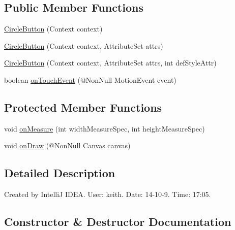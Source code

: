 \subsection*{Public Member Functions}
\begin{DoxyCompactItemize}
\item 
\hyperlink{classcom_1_1material_1_1widget_1_1_circle_button_ace4d6b43baac83ca347b00922e1c0b9b}{Circle\+Button} (Context context)
\item 
\hyperlink{classcom_1_1material_1_1widget_1_1_circle_button_a0d5e6959f7af5e24d5844e111317912f}{Circle\+Button} (Context context, Attribute\+Set attrs)
\item 
\hyperlink{classcom_1_1material_1_1widget_1_1_circle_button_acc8e3be79c7b4b07fa6b6d589f7baeeb}{Circle\+Button} (Context context, Attribute\+Set attrs, int def\+Style\+Attr)
\item 
boolean \hyperlink{classcom_1_1material_1_1widget_1_1_circle_button_aaf03ae476d043946b960514ed25950b0}{on\+Touch\+Event} (@Non\+Null Motion\+Event event)
\end{DoxyCompactItemize}
\subsection*{Protected Member Functions}
\begin{DoxyCompactItemize}
\item 
void \hyperlink{classcom_1_1material_1_1widget_1_1_circle_button_af2e05eabae656309891ea4c495c16e56}{on\+Measure} (int width\+Measure\+Spec, int height\+Measure\+Spec)
\item 
void \hyperlink{classcom_1_1material_1_1widget_1_1_circle_button_a9a195d523879f660eabc30bc47b418d6}{on\+Draw} (@Non\+Null Canvas canvas)
\end{DoxyCompactItemize}


\subsection{Detailed Description}
Created by IntelliJ I\+D\+EA. User\+: keith. Date\+: 14-\/10-\/9. Time\+: 17\+:05. 

\subsection{Constructor \& Destructor Documentation}
\mbox{\label{classcom_1_1material_1_1widget_1_1_circle_button_ace4d6b43baac83ca347b00922e1c0b9b}} 
